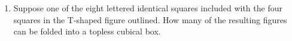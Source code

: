 \documentclass{article}
\theoremstyle{definition}
\newtheorem*{solution}{Solution}
\begin{document}
\begin{multicols*}{2}
\begin{enumerate}
\begin{solution}
\begin{align*}
                \end{align*}
            \end{solution}
        \item Suppose one of the eight lettered identical squares included with the four squares in the T-shaped figure outlined.
            How many of the resulting figures can be folded into a topless cubical box.
            \begin{center}
\end{center}
\end{enumerate}
\end{multicols*}
\end{document}
